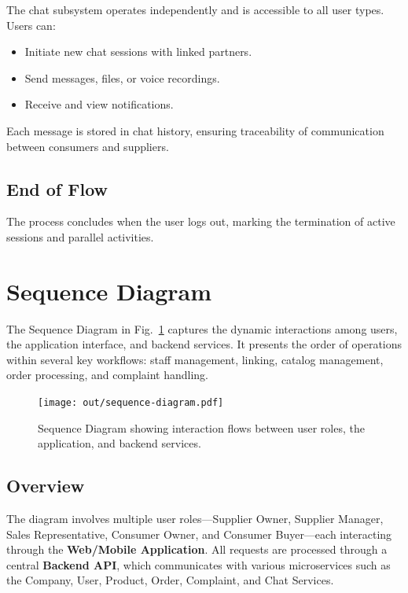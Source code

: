The chat subsystem operates independently and is accessible to all user types. Users can:
\begin{itemize}
    \item Initiate new chat sessions with linked partners.
    \item Send messages, files, or voice recordings.
    \item Receive and view notifications.
\end{itemize}

Each message is stored in chat history, ensuring traceability of communication between consumers and suppliers.

\subsection{End of Flow}

The process concludes when the user logs out, marking the termination of active sessions and parallel activities.

\section{Sequence Diagram}

The Sequence Diagram in Fig.~\ref{fig:sequence-diagram} captures the dynamic interactions among users, the application interface, and backend services. It presents the order of operations within several key workflows: staff management, linking, catalog management, order processing, and complaint handling.

\begin{figure}[t]
\centering
\texttt{[image: out/sequence-diagram.pdf]}
\caption{Sequence Diagram showing interaction flows between user roles, the application, and backend services.}
\label{fig:sequence-diagram}
\end{figure}

\subsection{Overview}

The diagram involves multiple user roles—Supplier Owner, Supplier Manager, Sales Representative, Consumer Owner, and Consumer Buyer—each interacting through the \textbf{Web/Mobile Application}. All requests are processed through a central \textbf{Backend API}, which communicates with various microservices such as the Company, User, Product, Order, Complaint, and Chat Services.

